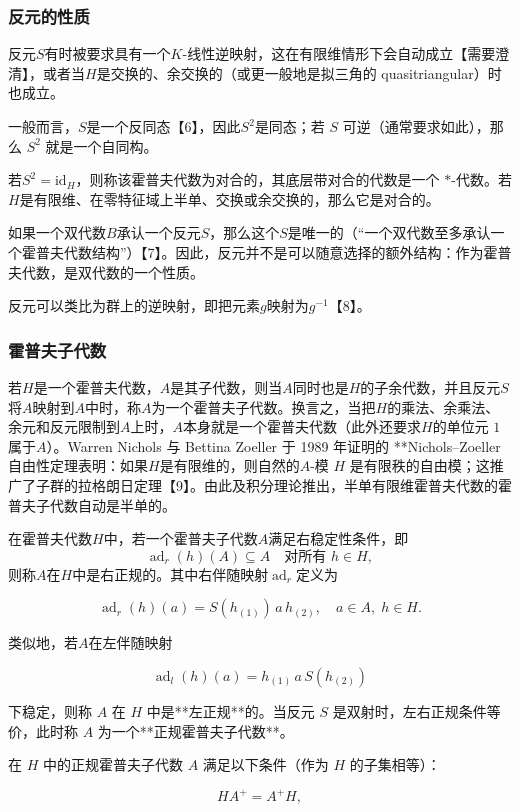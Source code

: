 \subsubsection{反元的性质}
反元$S$有时被要求具有一个$K$-线性逆映射，这在有限维情形下会自动成立【需要澄清】，或者当$H$是交换的、余交换的（或更一般地是拟三角的 quasitriangular）时也成立。

一般而言，$S$是一个反同态【6】，因此$S^2$是同态；若 $S$ 可逆（通常要求如此），那么 $S^2$ 就是一个自同构。

若$S^2 = \mathrm{id}_H$，则称该霍普夫代数为对合的，其底层带对合的代数是一个 $*$-代数。若$H$是有限维、在零特征域上半单、交换或余交换的，那么它是对合的。

如果一个双代数$B$承认一个反元$S$，那么这个$S$是唯一的（“一个双代数至多承认一个霍普夫代数结构”）【7】。因此，反元并不是可以随意选择的额外结构：作为霍普夫代数，是双代数的一个性质。

反元可以类比为群上的逆映射，即把元素$g$映射为$g^{-1}$【8】。
\subsubsection{霍普夫子代数}
若$H$是一个霍普夫代数，$A$是其子代数，则当$A$同时也是$H$的子余代数，并且反元$S$将$A$映射到$A$中时，称$A$为一个霍普夫子代数。换言之，当把$H$的乘法、余乘法、余元和反元限制到$A$上时，$A$本身就是一个霍普夫代数（此外还要求$H$的单位元 $1$属于$A$）。Warren Nichols 与 Bettina Zoeller 于 1989 年证明的 **Nichols–Zoeller 自由性定理表明：如果$H$是有限维的，则自然的$A$-模 $H$ 是有限秩的自由模；这推广了子群的拉格朗日定理【9】。由此及积分理论推出，半单有限维霍普夫代数的霍普夫子代数自动是半单的。

在霍普夫代数$H$中，若一个霍普夫子代数$A$满足右稳定性条件，即
$$
\operatorname{ad}_r(h)(A) \subseteq A \quad \text{对所有 } h \in H,
$$
则称$A$在$H$中是右正规的。其中右伴随映射$\operatorname{ad}_r$定义为

$$
\operatorname{ad}_r(h)(a) = S(h_{(1)})\, a \, h_{(2)}, \quad a \in A, \; h \in H.
$$

类似地，若$A$在左伴随映射

$$
\operatorname{ad}_l(h)(a) = h_{(1)}\, a \, S(h_{(2)})
$$

下稳定，则称 $A$ 在 $H$ 中是**左正规**的。当反元 $S$ 是双射时，左右正规条件等价，此时称 $A$ 为一个**正规霍普夫子代数**。

在 $H$ 中的正规霍普夫子代数 $A$ 满足以下条件（作为 $H$ 的子集相等）：

$$
H A^{+} = A^{+} H,
$$

